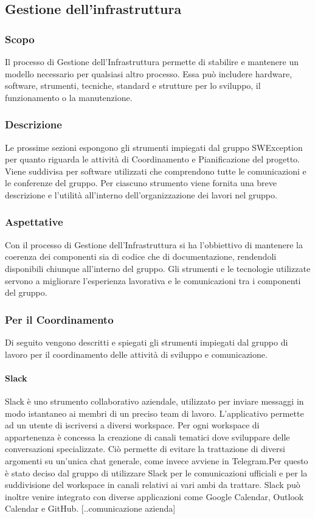 \subsection{Gestione dell'infrastruttura}
\subsubsection{Scopo}
Il processo di Gestione dell’Infrastruttura permette di stabilire e mantenere un modello necessario per qualsiasi altro processo. Essa può includere hardware, software, strumenti, tecniche, standard e strutture per lo sviluppo, il funzionamento o la
manutenzione.

\subsubsection{Descrizione}
Le prossime sezioni espongono gli strumenti impiegati dal gruppo SWException per quanto riguarda le attività di Coordinamento e Pianificazione del progetto. Viene suddivisa per software utilizzati che comprendono tutte le comunicazioni e le conferenze del gruppo. Per ciascuno strumento viene fornita una breve descrizione e l'utilità all'interno dell'organizzazione dei lavori nel gruppo.

\subsubsection{Aspettative}
Con il processo di Gestione dell’Infrastruttura si ha l'obbiettivo di mantenere la coerenza dei componenti sia di codice che di documentazione, rendendoli disponibili chiunque all'interno del gruppo. Gli strumenti e le tecnologie utilizzate servono a migliorare l'esperienza lavorativa e le comunicazioni tra i componenti del gruppo.


\subsubsection{Per il Coordinamento}
Di seguito vengono descritti e spiegati gli strumenti impiegati dal gruppo di lavoro per il coordinamento delle attività di sviluppo e comunicazione.

\paragraph{Slack}
Slack è uno strumento collaborativo aziendale, utilizzato per inviare messaggi in modo istantaneo ai membri di un preciso team di lavoro. L’applicativo permette ad un utente di iscriversi
a diversi workspace. Per ogni workspace di appartenenza è concessa la creazione di canali
tematici dove sviluppare delle conversazioni specializzate. Ciò permette di evitare la trattazione di diversi argomenti su un’unica chat generale, come invece avviene in Telegram.Per questo è stato deciso dal gruppo di utilizzare Slack per le comunicazioni ufficiali e per la suddivisione del workspace in canali relativi ai vari ambi da trattare. Slack può inoltre venire integrato con diverse applicazioni come Google Calendar, Outlook Calendar e GitHub.
    [..comunicazione azienda]

